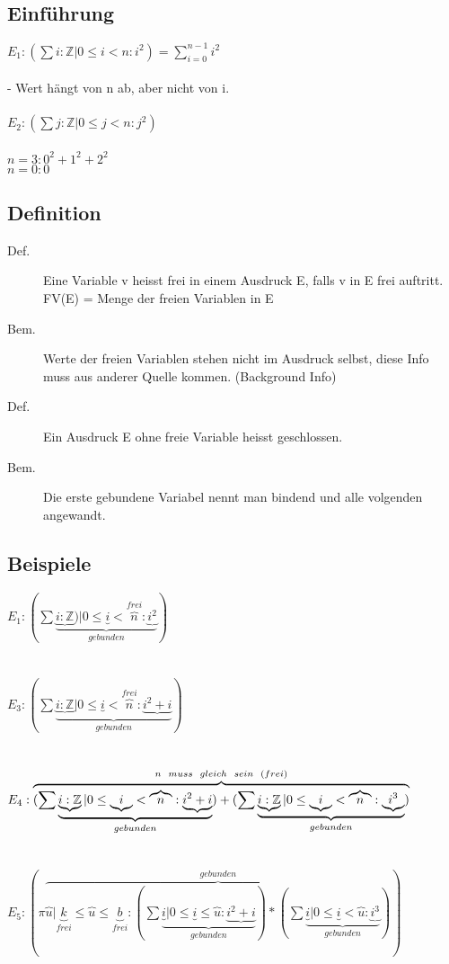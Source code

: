 \documentclass[a4paper,10pt]{article}
\newcommand{\ZN}{\mathbb{Z}} %
\begin{document}
\subsection{Einf\"uhrung}
$E_1:(\sum i : \ZN | 0 \leq i < n : i^2)=\sum^{n-1}_{i=0} i^2$ \\ \\
- Wert h\"angt von n ab, aber nicht von i. \\ \\
$E_2:(\sum j :\ZN | 0 \leq j < n : j^2)$ \\ \\
$n=3 :  0^2+1^2+2^2$ \\
$n=0 : 0$

\subsection{Definition}

\begin{description}
	\item[Def.] Eine Variable v heisst frei in einem Ausdruck E, falls v in E frei auftritt. \\
		FV(E) = Menge der freien Variablen in E
	\item[Bem.] Werte der freien Variablen stehen nicht im Ausdruck selbst, diese Info muss aus anderer Quelle kommen. (Background Info)
	\item[Def.] Ein Ausdruck E ohne freie Variable heisst geschlossen.
	\item[Bem.] Die erste gebundene Variabel nennt man bindend und alle volgenden angewandt.
\end{description}

\subsection{Beispiele}
$E_1 : (\sum \underbrace{\underbrace{i:\ZN}) | 0 \leq \underbrace{i} < \overbrace{n}^{frei} : \underbrace{i^2}}_{gebunden})$ \\ \\ \\
$E_3:(\sum \underbrace{\underbrace{i:\ZN} | 0 \leq  \underbrace{i} < \overbrace{n}^{frei} : \underbrace{i^2+i}}_{gebunden})$ \\ \\ \\
$E_4 : \overbrace{(\sum \underbrace{\underbrace{i:\ZN} | 0 \leq \underbrace{i} < \overbrace{n} : \underbrace{i^2+i}}_{gebunden}) +(\sum \underbrace{\underbrace{i:\ZN} | 0 \leq \underbrace{i} < \overbrace{n} : \underbrace{i^3}}_{gebunden})}^{n \hspace{2mm}  muss \hspace{2mm} gleich \hspace{2mm} sein \hspace{2mm} (frei)}$ \\ \\ \\
$E_5 :(\pi \overbrace{\overbrace{u} | \underbrace{k}_{frei} \leq \overbrace{u} \leq \underbrace{b}_{frei} : (\sum \underbrace{\underbrace{i} | 0 \leq \underbrace{i} \leq \overbrace{u} : \underbrace{i^2+i}}_{gebunden} )*(\sum \underbrace{\underbrace{i} | 0 \leq \underbrace{i} < \overbrace{u} : \underbrace{i^3}}_{gebunden})}^{gebunden})$
\end{document}
